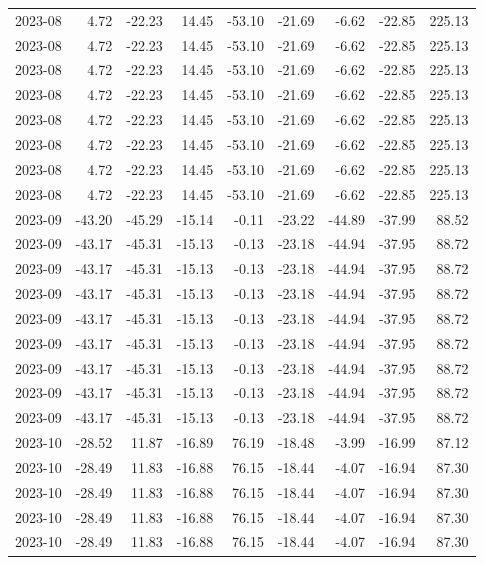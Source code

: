 \begin{table}[ht]
\begin{tabular}{lrrrrrrrr}
  2023-08 & 4.72 & -22.23 & 14.45 & -53.10 & -21.69 & -6.62 & -22.85 & 225.13 \\ 
  2023-08 & 4.72 & -22.23 & 14.45 & -53.10 & -21.69 & -6.62 & -22.85 & 225.13 \\ 
  2023-08 & 4.72 & -22.23 & 14.45 & -53.10 & -21.69 & -6.62 & -22.85 & 225.13 \\ 
  2023-08 & 4.72 & -22.23 & 14.45 & -53.10 & -21.69 & -6.62 & -22.85 & 225.13 \\ 
  2023-08 & 4.72 & -22.23 & 14.45 & -53.10 & -21.69 & -6.62 & -22.85 & 225.13 \\ 
  2023-08 & 4.72 & -22.23 & 14.45 & -53.10 & -21.69 & -6.62 & -22.85 & 225.13 \\ 
  2023-08 & 4.72 & -22.23 & 14.45 & -53.10 & -21.69 & -6.62 & -22.85 & 225.13 \\ 
  2023-08 & 4.72 & -22.23 & 14.45 & -53.10 & -21.69 & -6.62 & -22.85 & 225.13 \\ 
  2023-09 & -43.20 & -45.29 & -15.14 & -0.11 & -23.22 & -44.89 & -37.99 & 88.52 \\ 
  2023-09 & -43.17 & -45.31 & -15.13 & -0.13 & -23.18 & -44.94 & -37.95 & 88.72 \\ 
  2023-09 & -43.17 & -45.31 & -15.13 & -0.13 & -23.18 & -44.94 & -37.95 & 88.72 \\ 
  2023-09 & -43.17 & -45.31 & -15.13 & -0.13 & -23.18 & -44.94 & -37.95 & 88.72 \\ 
  2023-09 & -43.17 & -45.31 & -15.13 & -0.13 & -23.18 & -44.94 & -37.95 & 88.72 \\ 
  2023-09 & -43.17 & -45.31 & -15.13 & -0.13 & -23.18 & -44.94 & -37.95 & 88.72 \\ 
  2023-09 & -43.17 & -45.31 & -15.13 & -0.13 & -23.18 & -44.94 & -37.95 & 88.72 \\ 
  2023-09 & -43.17 & -45.31 & -15.13 & -0.13 & -23.18 & -44.94 & -37.95 & 88.72 \\ 
  2023-09 & -43.17 & -45.31 & -15.13 & -0.13 & -23.18 & -44.94 & -37.95 & 88.72 \\ 
  2023-10 & -28.52 & 11.87 & -16.89 & 76.19 & -18.48 & -3.99 & -16.99 & 87.12 \\ 
  2023-10 & -28.49 & 11.83 & -16.88 & 76.15 & -18.44 & -4.07 & -16.94 & 87.30 \\ 
  2023-10 & -28.49 & 11.83 & -16.88 & 76.15 & -18.44 & -4.07 & -16.94 & 87.30 \\ 
  2023-10 & -28.49 & 11.83 & -16.88 & 76.15 & -18.44 & -4.07 & -16.94 & 87.30 \\ 
  2023-10 & -28.49 & 11.83 & -16.88 & 76.15 & -18.44 & -4.07 & -16.94 & 87.30 \\ 

\end{tabular}
\end{table}
